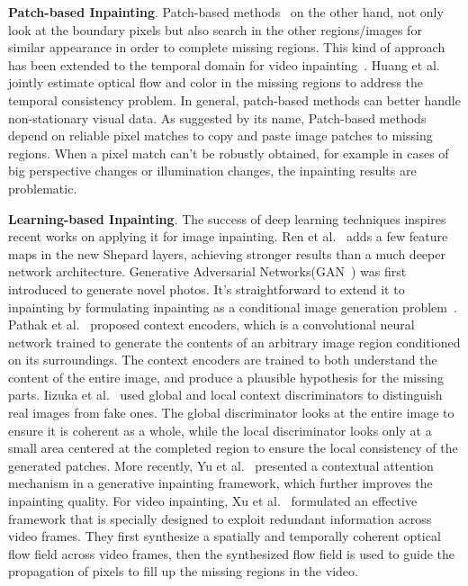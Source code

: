 \documentclass[runningheads]{llncs}
\begin{document}
\textbf{Patch-based Inpainting}. Patch-based methods~\cite{Bertalmio:2003:SST:2319023.2320434, Darabi12:ImageMelding12, Efros:2001:IQT:383259.383296, simakov2008summarizing} on the other hand, not only look at the boundary pixels but also search in the other regions/images for similar appearance in order to complete missing regions. This kind of approach has been extended to the temporal domain for video inpainting~\cite{Newson:2013:TFG:2534008.2534019, vics, Shih:2009:EVI:1641626.1641630}.   Huang et al.~\cite{Huang-SigAsia-2016} jointly estimate optical flow and color in the missing regions to address the temporal consistency problem. In general, patch-based methods can better handle non-stationary visual data. As suggested by its name, Patch-based methods depend on reliable pixel matches to copy and paste image patches to missing regions. When a pixel match can't be robustly obtained, for example in cases of big perspective changes or illumination changes, the inpainting results are problematic. 

\textbf{Learning-based Inpainting}. The success of deep learning techniques inspires recent works on applying it for image inpainting.   Ren et al.~\cite{NIPS2015_5774} adds a few feature maps in the new Shepard layers, achieving stronger results than a much deeper network architecture. Generative Adversarial Networks(GAN~\cite{NIPS2014_5423}) was first introduced to generate novel photos. It's straightforward to extend it to inpainting by formulating inpainting as a conditional image generation problem~\cite{IizukaSIGGRAPH2017, pathakCVPR16context, yu2018generative}. Pathak et al.~\cite{pathakCVPR16context} proposed context encoders, which is a convolutional neural network trained to generate the contents of an arbitrary image region conditioned on its surroundings. The context encoders are trained to both understand the content of the entire image, and produce a plausible hypothesis for the missing parts. Iizuka et al.~\cite{IizukaSIGGRAPH2017} used global and local context discriminators to distinguish real images from fake ones. The global discriminator looks at the entire image to ensure it is coherent as a whole, while the local discriminator looks only at a small area centered at the completed region to ensure the local consistency of the generated patches. More recently, Yu et al.~\cite{yu2018generative} presented a contextual attention mechanism in a generative inpainting framework, which further improves the inpainting quality. For video inpainting, Xu et al.~\cite{Xu_2019_CVPR} formulated an effective framework that is specially designed to exploit redundant information across video frames. They first synthesize a spatially and temporally coherent optical flow field across video frames, then the synthesized flow field is used to guide the propagation of pixels to fill up the missing regions in the video.
 
\end{document}
